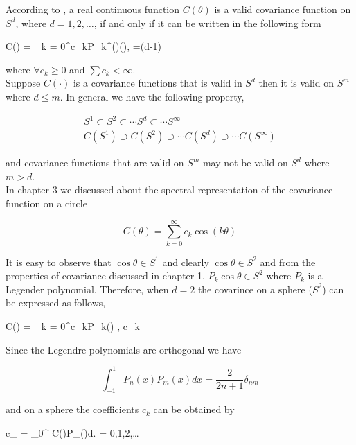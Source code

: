 	According to \cite{schoenberg1942}, a real continuous function $C(\theta)$ is a valid covariance function on $S^d$, where $d=1,2,\ldots$, if and only if it can be written in the following form
	
	\beq
	C(\theta) = \sum_{k = 0}^\infty c_kP_k^{(\nu)}(\cos\theta), \quad \nu=(d-1)
	\eeq
	
	where $\forall c_k\ge 0$ and $\sum c_k < \infty$. \\
	
	Suppose $C(\cdot)$ is a covariance functions that is valid in $S^d$ then it is valid on $S^m$ where $d\le m$. In general we have the following property,
	
	\begin{eqnarray*}
		S^1 \subset S^2 \subset \cdots S^{d} \subset \cdots S^{\infty} \\
		C(S^1) \supset C(S^2) \supset \cdots C(S^d) \supset \cdots C(S^{\infty})
	\end{eqnarray*}
	
	and covariance functions that are valid on $S^m$ may not be valid on $S^d$ where $m>d$. \\
	
	In chapter 3 we discussed about the spectral representation of the covariance function on a circle 
	
	\[
		C(\theta) = \sum_{k = 0}^\infty c_k\cos (k\theta)
	\]
	
	It is easy to observe that $\cos\theta \in S^1$ and clearly $\cos\theta \in S^2$ and from the properties of covariance discussed in chapter 1, $P_k\cos\theta \in S^2$ where $P_k$ is a Legender polynomial. Therefore, when $d=2$ the covarince on a sphere ($S^2$) can be expressed as follows,
	
	\beq \label{covs2_sum}
	C(\theta) = \sum_{k = 0}^\infty c_kP_k(\cos\theta) \quad , c_k 
	\eeq
	
	
	Since the Legendre polynomials are orthogonal we have
	
	\[
		\int_{-1}^{1} P_{n}(x)P_{m}(x)dx = \frac{2}{2n+1}\delta_{nm}
	\]
	
	and on a sphere the coefficients $c_k$ can be obtained by
	
	\beq \label{covs2_coef}
	c_{\nu} = \int_0^{\pi} C(\theta)P_{\nu}(\cos\theta)d\theta. \quad \nu = 0,1,2,\ldots
	\eeq
	
